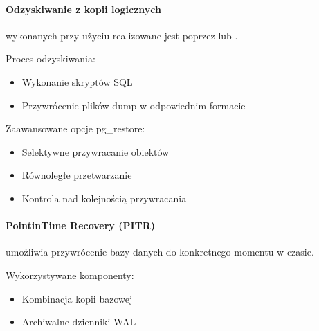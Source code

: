 \documentclass[letterpaper,10pt,polish]{sphinxmanual}
\begin{document}
\paragraph{Odzyskiwanie z kopii logicznych}
\label{\detokenize{rozdzial2/Kopie_zapasowe_i_odzyskiwanie_danych/kopie_zapasowe_i_odzyskiwanie_danych:odzyskiwanie-z-kopii-logicznych}}
\sphinxAtStartPar
{} wykonanych przy użyciu  realizowane jest poprzez  lub .

\sphinxAtStartPar
Proces odzyskiwania:
\begin{itemize}
\item {} 
\sphinxAtStartPar
Wykonanie skryptów SQL

\item {} 
\sphinxAtStartPar
Przywrócenie plików dump w odpowiednim formacie

\end{itemize}

\sphinxAtStartPar
Zaawansowane opcje pg\_restore:
\begin{itemize}
\item {} 
\sphinxAtStartPar
Selektywne przywracanie obiektów

\item {} 
\sphinxAtStartPar
Równoległe przetwarzanie

\item {} 
\sphinxAtStartPar
Kontrola nad kolejnością przywracania

\end{itemize}


\paragraph{Point\sphinxhyphen{}in\sphinxhyphen{}Time Recovery (PITR)}
\label{\detokenize{rozdzial2/Kopie_zapasowe_i_odzyskiwanie_danych/kopie_zapasowe_i_odzyskiwanie_danych:point-in-time-recovery-pitr}}
\sphinxAtStartPar
{} umożliwia przywrócenie bazy danych do konkretnego momentu w czasie.

\sphinxAtStartPar
Wykorzystywane komponenty:
\begin{itemize}
\item {} 
\sphinxAtStartPar
Kombinacja kopii bazowej

\item {} 
\sphinxAtStartPar
Archiwalne dzienniki WAL

\end{itemize}
\end{document}
